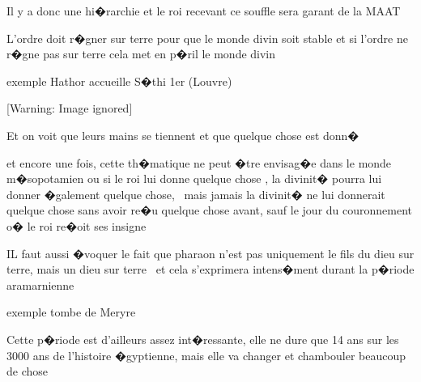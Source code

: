 \documentclass{article}
\begin{document}
Il y a donc une hi�rarchie et le roi recevant ce souffle sera garant de la MAAT


\bigskip

L'ordre doit r�gner sur terre pour que le monde divin soit stable et si l'ordre ne r�gne pas sur terre cela met en p�ril le monde divin


\bigskip


\bigskip


\bigskip


\bigskip


\bigskip


\bigskip


\bigskip


\bigskip


\bigskip


\bigskip


\bigskip


\bigskip


\bigskip

exemple Hathor accueille S�thi 1er (Louvre)


\bigskip


\bigskip

  [Warning: Image ignored] %
 


\bigskip

Et on voit que leurs mains se tiennent et que quelque chose est donn�

et encore une fois, cette th�matique ne peut �tre envisag�e dans le monde m�sopotamien ou si le roi lui donne quelque chose , la divinit� pourra lui donner �galement quelque chose, \ mais jamais la divinit� ne lui donnerait quelque chose sans avoir re�u quelque chose avant, sauf le jour du couronnement o� le roi re�oit ses insigne


\bigskip

IL faut aussi �voquer le fait que pharaon n'est pas uniquement le fils du dieu sur terre, mais un dieu sur terre \ et cela s'exprimera intens�ment durant la p�riode aramarnienne 

exemple tombe de Meryre

Cette p�riode est d'ailleurs assez int�ressante, elle ne dure que 14 ans sur les 3000 ans de l'histoire �gyptienne, mais elle va changer et chambouler beaucoup de chose


\bigskip


\bigskip
\end{document}
